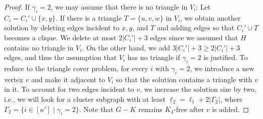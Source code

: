 \begin{proof}
  If $\gamma_i = 2$, we may assume that there is no triangle in $V_i$:
  Let $C_i = C_i' \cup \{ x, y \}$.
  If there is a triangle $T = \{ u, v, w \}$ in $V_i$, we obtain another solution by deleting edges incident to $x, y$, and $T$ and adding edges so that $C_i' \cup T$ becomes a clique.
  We delete at most $2 |C_i'| + 3$ edges since we assumed that $H$ contains no triangle in $V_i$.
  On the other hand, we add $3 |C_i'| + 3 \ge 2|C_i'| + 3$ edges, and thus the assumption that $V_i$ has no triangle if $\gamma_i = 2$ is justified.
  To reduce to the triangle cover problem, for every $i$ with $\gamma_i = 2$, we introduce a new vertex $v$ and make it adjacent to $V_i$ so that the solution contains a triangle with $v$ in it.
  To account for two edges incident to $v$, we increase the solution size by two, i.e., we will look for a cluster subgraph with at least $\ell_2 = \ell_1 + 2 |\Gamma_2|$, where $\Gamma_2  = \{ i \in [\kappa'] \mid \gamma_i = 2 \}$.
  Note that $G - K$ remains $K_4$-free after $v$ is added.


\end{proof}
